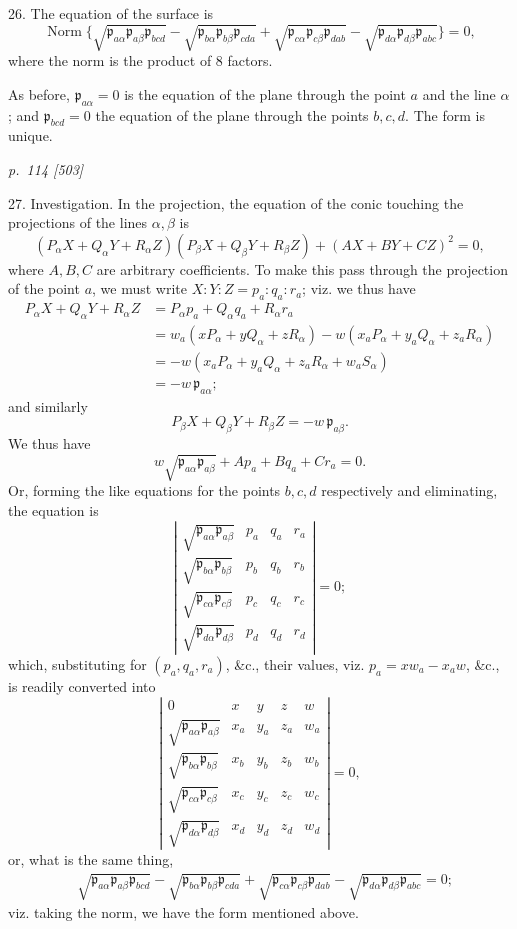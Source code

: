 \documentclass[11pt,a4paper]{article}
\newcommand{\sourcepage}[2]{%
  \bigskip
  \noindent\textit{p.~#1 [#2]}%
  \par\smallskip
}
\newcommand{\Det}[1]{\left|\begin{matrix}#1\end{matrix}\right|}
\newcommand{\surf}[1]{\par\smallskip\noindent{\itshape \{Surface $#1$.\}}\par\smallskip}
\newcommand{\p}{\mathfrak p}
\begin{document}
26. The equation of the surface is
\[
\operatorname{Norm}\{\sqrt{\p_{a\alpha}\p_{a\beta}\p_{bcd}}
-\sqrt{\p_{b\alpha}\p_{b\beta}\p_{cda}}
+\sqrt{\p_{c\alpha}\p_{c\beta}\p_{dab}}
-\sqrt{\p_{d\alpha}\p_{d\beta}\p_{abc}}\}=0,
\]
where the norm is the product of 8 factors.

As before, $\p_{a\alpha}=0$ is the equation of the plane through the point $a$ and
the line $\alpha$; and $\p_{bcd}=0$ the equation of the plane through the points
$b,c,d$. The form is unique.
\surf{abcd\alpha\beta}

\sourcepage{114}{503}
27. Investigation. In the projection, the equation of the conic touching the
projections of the lines $\alpha,\beta$ is
\[
(P_\alpha X+Q_\alpha Y+R_\alpha Z)(P_\beta X+Q_\beta Y+R_\beta Z)
+(AX+BY+CZ)^2=0,
\]
where $A,B,C$ are arbitrary coefficients. To make this pass through the projection
of the point $a$, we must write $X:Y:Z=p_a:q_a:r_a$; viz. we thus have
\[
\begin{aligned}
P_\alpha X+Q_\alpha Y+R_\alpha Z
&=P_\alpha p_a+Q_\alpha q_a+R_\alpha r_a\\
&=w_a(xP_\alpha+yQ_\alpha+zR_\alpha)
-w(x_aP_\alpha+y_aQ_\alpha+z_aR_\alpha)\\
&=-w(x_aP_\alpha+y_aQ_\alpha+z_aR_\alpha+w_aS_\alpha)\\
&=-w\,\p_{a\alpha};
\end{aligned}
\]
and similarly
\[
P_\beta X+Q_\beta Y+R_\beta Z=-w\,\p_{a\beta}.
\]
We thus have
\[
w\sqrt{\p_{a\alpha}\p_{a\beta}}+Ap_a+Bq_a+Cr_a=0.
\]
Or, forming the like equations for the points $b,c,d$ respectively and eliminating,
the equation is
\[
\Det{\sqrt{\p_{a\alpha}\p_{a\beta}}&p_a&q_a&r_a\\
\sqrt{\p_{b\alpha}\p_{b\beta}}&p_b&q_b&r_b\\
\sqrt{\p_{c\alpha}\p_{c\beta}}&p_c&q_c&r_c\\
\sqrt{\p_{d\alpha}\p_{d\beta}}&p_d&q_d&r_d}=0;
\]
which, substituting for $(p_a,q_a,r_a)$, \&c., their values, viz.
$p_a=xw_a-x_aw$, \&c., is readily converted into
\[
\Det{
0&x&y&z&w\\
\sqrt{\p_{a\alpha}\p_{a\beta}}&x_a&y_a&z_a&w_a\\
\sqrt{\p_{b\alpha}\p_{b\beta}}&x_b&y_b&z_b&w_b\\
\sqrt{\p_{c\alpha}\p_{c\beta}}&x_c&y_c&z_c&w_c\\
\sqrt{\p_{d\alpha}\p_{d\beta}}&x_d&y_d&z_d&w_d}=0,
\]
or, what is the same thing,
\[
\begin{aligned}
&\sqrt{\p_{a\alpha}\p_{a\beta}\p_{bcd}}
-\sqrt{\p_{b\alpha}\p_{b\beta}\p_{cda}}
+\sqrt{\p_{c\alpha}\p_{c\beta}\p_{dab}}
-\sqrt{\p_{d\alpha}\p_{d\beta}\p_{abc}}=0;
\end{aligned}
\]
viz. taking the norm, we have the form mentioned above.
\end{document}

